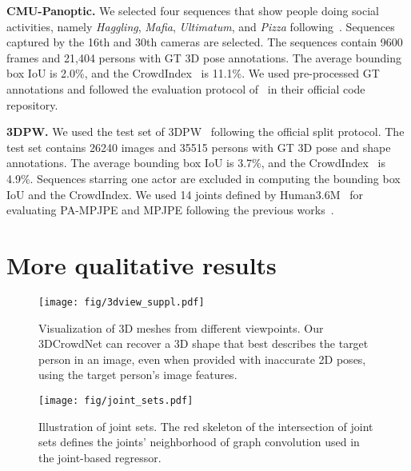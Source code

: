\documentclass[10pt,twocolumn,letterpaper]{article}
\begin{document}
\noindent\textbf{CMU-Panoptic.}
We selected four sequences that show people doing social activities, namely \textit{Haggling}, \textit{Mafia}, \textit{Ultimatum}, and \textit{Pizza} following~\cite{zanfir2018monocular,jiang2020coherent}.
Sequences captured by the 16th and 30th cameras are selected.
The sequences contain 9600 frames and 21,404 persons with GT 3D pose annotations.
The average bounding box IoU is 2.0\%, and the CrowdIndex~\cite{li2019crowdpose} is 11.1\%.
We used pre-processed GT annotations and followed the evaluation protocol of~\cite{jiang2020coherent} in their official code repository. 


\noindent\textbf{3DPW.}
We used the test set of 3DPW~\cite{von20183dpw} following the official split protocol.
The test set contains 26240 images and 35515 persons with GT 3D pose and shape annotations.
The average bounding box IoU is 3.7\%, and the CrowdIndex~\cite{li2019crowdpose} is 4.9\%.
Sequences starring one actor are excluded in computing the bounding box IoU and the CrowdIndex.
We used 14 joints defined by Human3.6M~\cite{ionescu2014human3} for evaluating PA-MPJPE and MPJPE following the previous works~\cite{kolotouros2019learning,choi2020p2m,moon2020i2l}. \section{More qualitative results}
\label{supp:quality}

\begin{figure}[!t]
\begin{center}
\texttt{[image: fig/3dview\_suppl.pdf]}   
\end{center}
  \caption{
  Visualization of 3D meshes from different viewpoints. Our 3DCrowdNet can recover a 3D shape that best describes the target person in an image, even when provided with inaccurate 2D poses, using the target person's image features.
  }
\label{fig:pose_correction}
\end{figure}



\begin{figure}[!t]
\begin{center}
\texttt{[image: fig/joint\_sets.pdf]}
\end{center}
  \caption{
  Illustration of joint sets. The red skeleton of the intersection of joint sets defines the joints' neighborhood of graph convolution used in the joint-based regressor. 
  }
\label{fig:joint_sets}
\end{figure}
\end{document}

